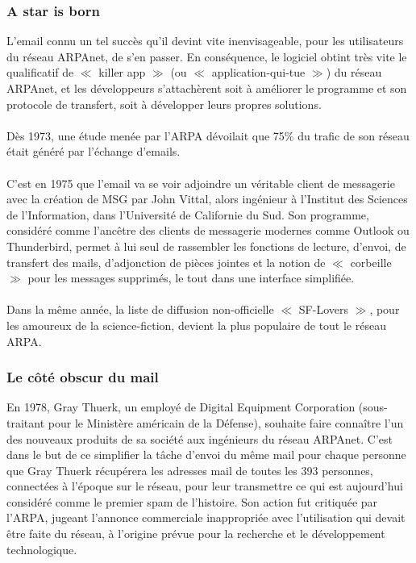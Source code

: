 \documentclass[french]{report}
\begin{document}
\begin{titlepage}
\subsubsection{\LARGE A star is born}
\LARGE L’email connu un tel succès qu’il devint vite inenvisageable, pour les utilisateurs du réseau ARPAnet, de s’en passer. En conséquence, le logiciel obtint très vite le qualificatif de $\ll$ killer app $\gg$ (ou $\ll$ application-qui-tue $\gg$) du réseau ARPAnet, et les développeurs s’attachèrent soit à améliorer le programme et son protocole de transfert, soit à développer leurs propres solutions.\\ \\
Dès 1973, une étude menée par l’ARPA dévoilait que 75\% du trafic de son réseau était généré par l’échange d’emails.\\ \\
C’est en 1975 que l’email va se voir adjoindre un véritable client de messagerie avec la création de MSG par John Vittal, alors ingénieur à l’Institut des Sciences de l’Information, dans l’Université de Californie du Sud. Son programme, considéré comme l’ancêtre des clients de messagerie modernes comme Outlook ou Thunderbird, permet à lui seul de rassembler les fonctions de lecture, d’envoi, de transfert des mails, d’adjonction de pièces jointes et la notion de $\ll$ corbeille $\gg$ pour les messages supprimés, le tout dans une interface simplifiée.\\ \\
Dans la même année, la liste de diffusion non-officielle $\ll$ SF-Lovers $\gg$, pour les amoureux de la science-fiction, devient la plus populaire de tout le réseau ARPA.
\subsubsection{\LARGE Le côté obscur du mail}
\LARGE En 1978, Gray Thuerk, un employé de Digital Equipment Corporation (sous-traitant pour le Ministère américain de la Défense), souhaite faire connaître l’un des nouveaux produits de sa société aux ingénieurs du réseau ARPAnet. C’est dans le but de ce simplifier la tâche d’envoi du même mail pour chaque personne que Gray Thuerk récupérera les adresses mail de toutes les 393 personnes, connectées à l’époque sur le réseau, pour leur transmettre ce qui est aujourd’hui considéré comme le premier spam de l’histoire. Son action fut critiquée par l’ARPA, jugeant l’annonce commerciale inappropriée avec l’utilisation qui devait être faite du réseau, à l’origine prévue pour la recherche et le développement technologique.

\end{titlepage}
\end{document}
